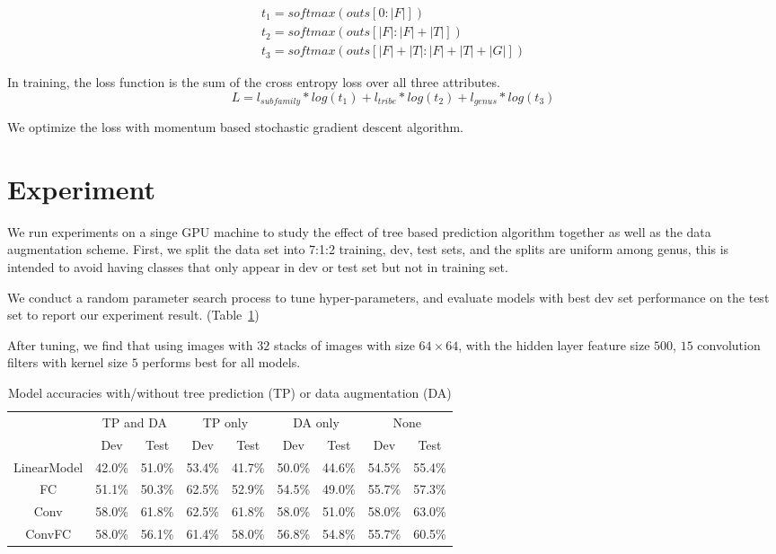 \documentclass{article}
\begin{document}
\[
\begin{array}{l}
t_1 = \mathit{softmax}(\mathit{outs}[0:|F|])\\
t_2 = \mathit{softmax}(\mathit{outs}[|F|: |F| + |T|])\\
t_3 = \mathit{softmax}(\mathit{outs}[|F| + |T|:|F| + |T| + |G|])
\end{array}
\]

In training, the loss function is the sum of the cross entropy loss over all three attributes. 
$$L = l_{\mathit{subfamily}} * log(t_1) + l_{\mathit{tribe}} * log(t_2) +  l_{\mathit{genus}} * log(t_3)$$

We optimize the loss with momentum based stochastic gradient descent algorithm.


\section{Experiment}

We run experiments on a singe GPU machine to study the effect of tree based prediction algorithm together as well as the data augmentation scheme. First, we split the data set into 7:1:2 training, dev, test sets, and the splits are uniform among genus, this is intended to avoid having classes that only appear in dev or test set but not in training set.

We conduct a random parameter search process to tune hyper-parameters, and evaluate models with best dev set performance on the test set to report our experiment result. (Table~\ref{t1}) 

After tuning, we find that using images with $32$ stacks of images with size $64\times64$, with the hidden layer feature size $500$, $15$ convolution filters with kernel size $5$ performs best for all models. 

\begin{table}[h]
\centering
\begin{tabular}{ |c|c|c|c|c|c|c|c|c| } 
\hline  
& \multicolumn{2}{|c|}{TP and DA} & \multicolumn{2}{|c|}{TP only} & \multicolumn{2}{|c|}{DA only} & \multicolumn{2}{|c|}{None}\\\cline{2-9}  
 			& Dev    & Test   & Dev    & Test   & Dev    & Test   & Dev    & Test \\\hline\hline 
LinearModel & 42.0\% & 51.0\% & 53.4\% & 41.7\% & 50.0\% & 44.6\% & 54.5\% & 55.4\%\\ 
FC 		 	& 51.1\% & 50.3\% & 62.5\% & 52.9\% & 54.5\% & 49.0\% & 55.7\% & 57.3\%\\ 
Conv 		& 58.0\% & 61.8\% & 62.5\% & 61.8\% & 58.0\% & 51.0\% & 58.0\% & 63.0\%\\
ConvFC 	 	& 58.0\% & 56.1\% & 61.4\% & 58.0\% & 56.8\% & 54.8\% & 55.7\% & 60.5\%\\
\hline
\end{tabular}
\caption{Model accuracies with/without tree prediction (TP) or data augmentation (DA) }
\label{t1}
\end{table}
\end{document}
